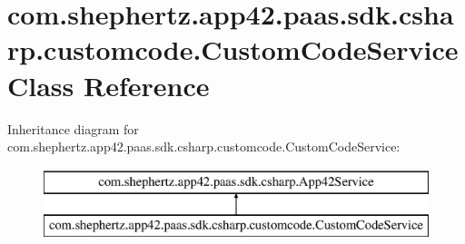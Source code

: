 \hypertarget{classcom_1_1shephertz_1_1app42_1_1paas_1_1sdk_1_1csharp_1_1customcode_1_1_custom_code_service}{\section{com.\+shephertz.\+app42.\+paas.\+sdk.\+csharp.\+customcode.\+Custom\+Code\+Service Class Reference}
\label{classcom_1_1shephertz_1_1app42_1_1paas_1_1sdk_1_1csharp_1_1customcode_1_1_custom_code_service}
}
Inheritance diagram for com.\+shephertz.\+app42.\+paas.\+sdk.\+csharp.\+customcode.\+Custom\+Code\+Service\+:\begin{figure}[H]
\begin{center}
\leavevmode
\includegraphics[height=2.000000cm]{classcom_1_1shephertz_1_1app42_1_1paas_1_1sdk_1_1csharp_1_1customcode_1_1_custom_code_service}
\end{center}
\end{figure}

